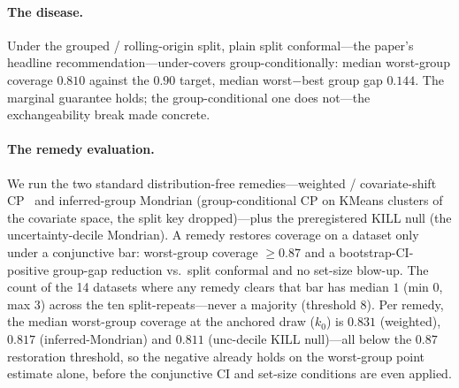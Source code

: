 \documentclass[pdflatex,sn-mathphys-num]{sn-jnl}
\begin{document}
\paragraph{The disease.} Under the grouped / rolling-origin split, plain split conformal---the paper's headline
recommendation---under-covers group-conditionally: median worst-group coverage $0.810$ against the
$0.90$ target, median worst$-$best group gap $0.144$. The marginal guarantee holds; the group-conditional one
does not---the exchangeability break made concrete.

\paragraph{The remedy evaluation.} We run the two standard distribution-free remedies---weighted /
covariate-shift CP~\citep{tibshirani2019covariate} and inferred-group Mondrian (group-conditional CP on
KMeans clusters of the covariate space, the split key dropped)---plus the preregistered KILL null
(the uncertainty-decile Mondrian). A remedy restores coverage on a dataset only under a
conjunctive bar: worst-group coverage $\geq0.87$ and a bootstrap-CI-positive group-gap
reduction vs.\ split conformal and no set-size blow-up. The count of the 14 datasets where any
remedy clears that bar has median $1$ (min $0$, max $3$) across the ten split-repeats---never a majority
(threshold $8$). Per remedy, the median worst-group coverage at the anchored draw ($k_0$) is $0.831$
(weighted), $0.817$ (inferred-Mondrian) and $0.811$ (unc-decile KILL null)---all below the $0.87$
restoration threshold, so the negative already holds on the worst-group point estimate alone, before
the conjunctive CI and set-size conditions are even applied.
\end{document}
